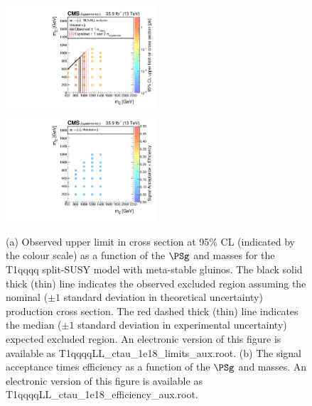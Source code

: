 \clearpage
\begin{figure}
    \begin{center}
            \includegraphics[width=0.50\textwidth]{Supplementary/CMS-SUS-16-038_Figure-aux_022-a}
	    \includegraphics[width=0.50\textwidth]{Supplementary/CMS-SUS-16-038_Figure-aux_022-b}
        \caption{ (a) Observed upper limit in cross section at 95\% CL (indicated
        by the colour scale) as a function of 
        the $\PSg$ and \PSGczDo %
        masses for the 
        T1qqqq split-SUSY model with meta-stable gluinos. 
         The  black  solid thick  (thin)  line indicates  the
        observed  excluded  region  assuming   the  nominal  (${\pm}1$  standard
        deviation in theoretical uncertainty)  production cross section. The red
        dashed  thick  (thin)  line  indicates  the  median  (${\pm}1$  standard
        deviation in experimental uncertainty) expected excluded region.
    An electronic version of this figure is available as T1qqqqLL\_ctau\_1e18\_limits\_aux.root.
        (b) The signal acceptance times efficiency as a function of 
        the $\PSg$ and \PSGczDo %
        masses.
    An electronic version of this figure is available as T1qqqqLL\_ctau\_1e18\_efficiency\_aux.root.
        }
        \label{fig:T1qqqqLL}
    \end{center}
\end{figure}


